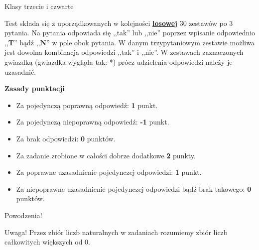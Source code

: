 \documentclass[12pt, a4paper]{article}
\begin{document}
	\begin{center}{}
				\newline \newline Klasy trzecie i czwarte\end{center}
\par
\vspace{0.3cm}
Test składa się z uporządkowanych w kolejności \underline{\textbf{losowej}} 30 zestawów po 3 pytania. Na pytania odpowiada się ,,tak'' lub ,,nie'' poprzez wpisanie odpowiednio ,,\textbf{T}'' bądź ,,\textbf{N}''
w pole obok pytania. W danym trzypytaniowym zestawie możliwa jest dowolna kombinacja
odpowiedzi ,,tak'' i ,,nie''. W zestawach zaznaczonych gwiazdką (gwiazdka wygląda tak: *)
prócz udzielenia odpowiedzi należy je uzasadnić.
\vspace{0.5cm}
\par
\textbf{Zasady punktacji}
\begin{itemize}
   \item Za pojedynczą poprawną odpowiedź: \textbf{1} punkt.
   \item Za pojedynczą niepoprawną odpowiedź: \textbf{-1} punkt.
   \item Za brak odpowiedzi: \textbf{0} punktów.
   \item Za zadanie zrobione w całości dobrze dodatkowe \textbf{2} punkty.
   \item Za poprawne uzasadnienie pojedynczej odpowiedzi: \textbf{1} punkt.
   \item Za niepoprawne uzasadnienie pojedynczej odpowiedzi bądź brak takowego: \textbf{0} punktów.
\end{itemize}
	\begin{center}Powodzenia!\end{center}
Uwaga! Przez zbiór liczb naturalnych w zadaniach rozumiemy zbiór liczb całkowitych większych od $0$.
\vspace{0.2cm}

\renewcommand{\labelitemi}{\LARGE{$\square$}}
\newcommand{\normalitem}{\stepcounter{enumi}\item[\textbf{\theenumi. }]}
\newcommand{\asterixitem}{\stepcounter{enumi}\item[\textbf{\theenumi*. }]}
\end{document}
